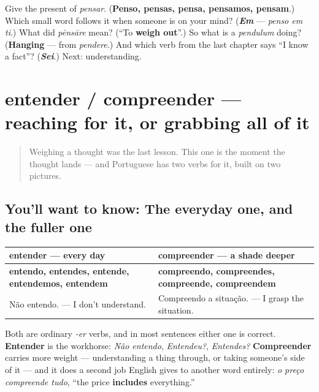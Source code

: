 \begin{tcolorbox}[breakable,colback=teal!4,colframe=teal!35!black,title={Before you move on}]
Give the present of \emph{pensar}. (\textbf{Penso, pensas, pensa, pensamos, pensam}.) Which small word follows it when someone is on your mind? (\emph{\textbf{Em}} — \emph{penso em ti}.) What did \emph{pēnsāre} mean? (\textquotedblleft{}To \textbf{weigh out}\textquotedblright{}.) So what is a \emph{pendulum} doing? (\textbf{Hanging} — from \emph{pendere}.) And which verb from the last chapter says \textquotedblleft{}I know a fact\textquotedblright{}? (\emph{\textbf{Sei}}.) Next: understanding.
\end{tcolorbox}
\section[entender / compreender]{entender / compreender — reaching for it, or grabbing all of it}

\label{lesson:PT-C19-entender-compreender}



\begin{quote}
Weighing a thought was the last lesson. This one is the moment the thought lands — and Portuguese has two verbs for it, built on two pictures.
\end{quote}

\subsection*{You'll want to know: The everyday one, and the fuller one}
\noindent
\begin{tabularx}{\linewidth}{@{}>{\raggedright\arraybackslash}X>{\raggedright\arraybackslash}X@{}}
\toprule
\textbf{entender — every day} & \textbf{compreender — a shade deeper} \\
\midrule
\textbf{entendo, entendes, entende, entendemos, entendem} & \textbf{compreendo, compreendes, compreende, compreendem} \\
Não entendo. — I don't understand. & Compreendo a situação. — I grasp the situation. \\
\bottomrule
\end{tabularx}

Both are ordinary \emph{-er} verbs, and in most sentences either one is correct. \textbf{Entender} is the workhorse: \emph{Não entendo}, \emph{Entendeu?}, \emph{Entendes?} \textbf{Compreender} carries more weight — understanding a thing through, or taking someone's side of it — and it does a second job English gives to another word entirely: \emph{o preço compreende tudo}, \textquotedblleft{}the price \textbf{includes} everything.\textquotedblright{}

